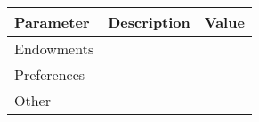 \begin{tabular}{lrr}
\hline
Parameter & Description  & Value  \\
\hline
Endowments &   &   \\
Preferences &   &   \\
Other &   &   \\
\hline
\end{tabular}%
